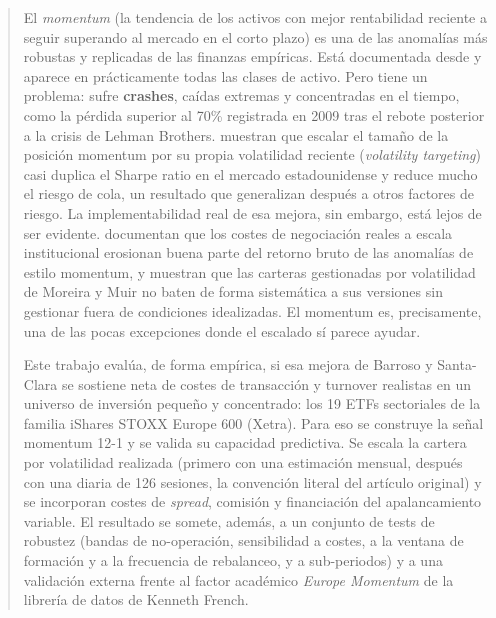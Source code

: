 \documentclass[12pt]{report} %
\begin{document}
\renewcommand\abstractname{\large\bfseries\filcenter\uppercase{Abstract}}
\begin{abstract}
\thispagestyle{plain}
\setcounter{page}{3}

	El \textit{momentum} (la tendencia de los activos con mejor rentabilidad reciente a seguir superando al mercado en el corto plazo) es una de las anomalías más robustas y replicadas de las finanzas empíricas. Está documentada desde \citet{jegadeeshtitman1993} y aparece en prácticamente todas las clases de activo. Pero tiene un problema: sufre \textbf{crashes}, caídas extremas y concentradas en el tiempo, como la pérdida superior al 70\% registrada en 2009 tras el rebote posterior a la crisis de Lehman Brothers. \citet{barroso2015} muestran que escalar el tamaño de la posición momentum por su propia volatilidad reciente (\textit{volatility targeting}) casi duplica el Sharpe ratio en el mercado estadounidense y reduce mucho el riesgo de cola, un resultado que \citet{moreiramuir2017} generalizan después a otros factores de riesgo. La implementabilidad real de esa mejora, sin embargo, está lejos de ser evidente. \citet{frazzini2018} documentan que los costes de negociación reales a escala institucional erosionan buena parte del retorno bruto de las anomalías de estilo momentum, y \citet{cederburg2020} muestran que las carteras gestionadas por volatilidad de Moreira y Muir no baten de forma sistemática a sus versiones sin gestionar fuera de condiciones idealizadas. El momentum es, precisamente, una de las pocas excepciones donde el escalado sí parece ayudar.

	Este trabajo evalúa, de forma empírica, si esa mejora de Barroso y Santa-Clara se sostiene neta de costes de transacción y turnover realistas en un universo de inversión pequeño y concentrado: los 19 ETFs sectoriales de la familia iShares STOXX Europe 600 (Xetra). Para eso se construye la señal momentum 12-1 y se valida su capacidad predictiva. Se escala la cartera por volatilidad realizada (primero con una estimación mensual, después con una diaria de 126 sesiones, la convención literal del artículo original) y se incorporan costes de \textit{spread}, comisión y financiación del apalancamiento variable. El resultado se somete, además, a un conjunto de tests de robustez (bandas de no-operación, sensibilidad a costes, a la ventana de formación y a la frecuencia de rebalanceo, y a sub-periodos) y a una validación externa frente al factor académico \textit{Europe Momentum} de la librería de datos de Kenneth French.


\end{abstract}
\end{document}
